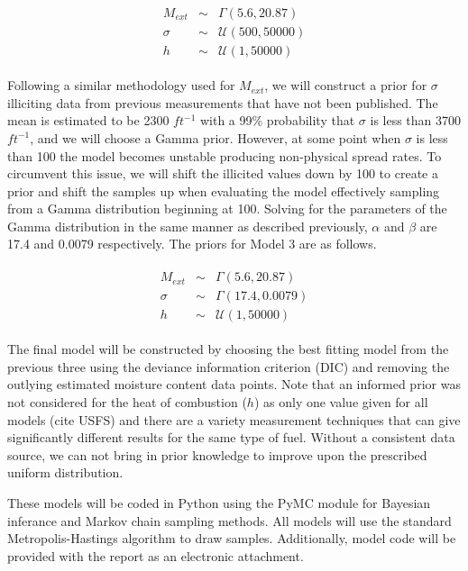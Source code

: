 \documentclass[11pt]{article}
\begin{document}
\begin{align}
\begin{array}{ccc}
M_{ext} &\sim& \Gamma(5.6,20.87) \\
\sigma &\sim& \mathcal{U}(500,50000) \\
h &\sim& \mathcal{U}(1,50000)
\end{array}
\label{eq:mod2_priors}
\end{align}

Following a similar methodology used for $M_{ext}$, we will construct a prior for $\sigma$ illiciting data from previous measurements that have not been published. The mean is estimated to be 2300 $ft^{-1}$ with a 99\% probability that $\sigma$ is less than 3700 $ft^{-1}$, and we will choose a Gamma prior. However, at some point when $\sigma$ is less than 100 the model becomes unstable producing non-physical spread rates. To circumvent this issue, we will shift the illicited values down by 100 to create a prior and shift the samples up when evaluating the model effectively sampling from a Gamma distribution beginning at 100. Solving for the parameters of the Gamma distribution in the same manner as described previously, $\alpha$ and $\beta$ are 17.4 and 0.0079 respectively. The priors for Model 3 are as follows. 

\begin{align}
\begin{array}{ccc}
M_{ext} &\sim& \Gamma(5.6,20.87) \\
\sigma &\sim& \Gamma(17.4,0.0079) \\
h &\sim& \mathcal{U}(1,50000)
\end{array}
\label{eq:mod3_priors}
\end{align}

The final model will be constructed by choosing the best fitting model from the previous three using the deviance information criterion (DIC) and removing the outlying estimated moisture content data points. Note that an informed prior was not considered for the heat of combustion ($h$) as only one value given for all models (cite USFS) and there are a variety measurement techniques that can give significantly different results for the same type of fuel. Without a consistent data source, we can not bring in prior knowledge to improve upon the prescribed uniform distribution. 

These models will be coded in Python using the PyMC module for Bayesian inferance and Markov chain sampling methods. All models will use the standard Metropolis-Hastings algorithm to draw samples. Additionally, model code will be provided with the report as an electronic attachment.
\end{document}
